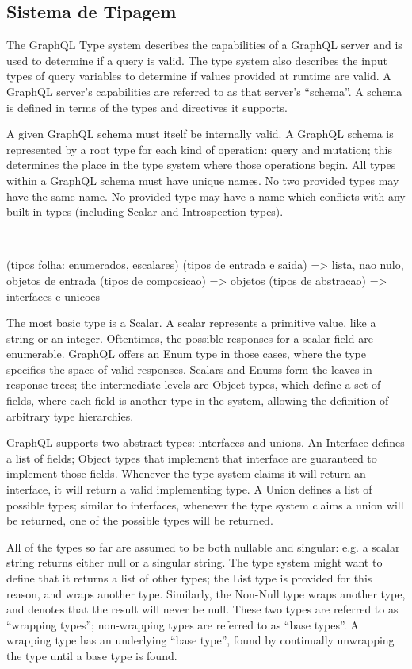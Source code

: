 \subsection[Sistema de Tipagem]{Sistema de Tipagem}

The GraphQL Type system describes the capabilities of a GraphQL server and is used to determine if a query is valid. The type system also describes the input types of query variables to determine if values provided at runtime are valid. A GraphQL server’s capabilities are referred to as that server’s “schema”. A schema is defined in terms of the types and directives it supports.

A given GraphQL schema must itself be internally valid. A GraphQL schema is represented by a root type for each kind of operation: query and mutation; this determines the place in the type system where those operations begin. All types within a GraphQL schema must have unique names. No two provided types may have the same name. No provided type may have a name which conflicts with any built in types (including Scalar and Introspection types).

-------

(tipos folha: enumerados, escalares)
(tipos de entrada e saida) => lista, nao nulo, objetos de entrada
(tipos de composicao) => objetos
(tipos de abstracao) => interfaces e unicoes

The most basic type is a Scalar. A scalar represents a primitive value, like a string or an integer. Oftentimes, the possible responses for a scalar field are enumerable. GraphQL offers an Enum type in those cases, where the type specifies the space of valid responses. Scalars and Enums form the leaves in response trees; the intermediate levels are Object types, which define a set of fields, where each field is another type in the system, allowing the definition of arbitrary type hierarchies.

GraphQL supports two abstract types: interfaces and unions. An Interface defines a list of fields; Object types that implement that interface are guaranteed to implement those fields. Whenever the type system claims it will return an interface, it will return a valid implementing type. A Union defines a list of possible types; similar to interfaces, whenever the type system claims a union will be returned, one of the possible types will be returned.

All of the types so far are assumed to be both nullable and singular: e.g. a scalar string returns either null or a singular string. The type system might want to define that it returns a list of other types; the List type is provided for this reason, and wraps another type. Similarly, the Non-Null type wraps another type, and denotes that the result will never be null. These two types are referred to as “wrapping types”; non-wrapping types are referred to as “base types”. A wrapping type has an underlying “base type”, found by continually unwrapping the type until a base type is found.

